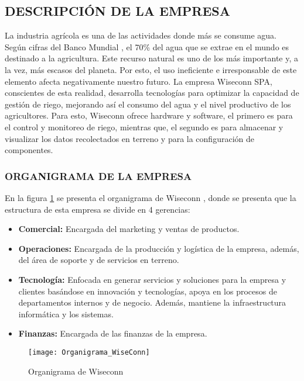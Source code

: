 
\subsection{DESCRIPCIÓN DE LA EMPRESA}

La industria agrícola es una de las actividades donde más se consume agua. Según cifras del Banco Mundial \cite{bancomundialagua}, el 70\% del agua que se extrae en el mundo es destinado a la agricultura. Este recurso natural es uno de los más importante y, a la vez, más escasos del planeta. Por esto, el uso ineficiente e irresponsable de este elemento afecta negativamente nuestro futuro.
La empresa Wiseconn SPA, conscientes de esta realidad, desarrolla tecnologías para optimizar la capacidad de gestión de riego, mejorando así el consumo del agua y el nivel productivo de los agricultores. Para esto, Wiseconn ofrece hardware y software, el primero es para el control y monitoreo de riego, mientras que, el segundo es para almacenar y visualizar los datos recolectados en terreno y para la configuración de componentes.

\subsubsection{ORGANIGRAMA DE LA EMPRESA}

En la figura \ref{fig:orgwis} se presenta el organigrama de Wiseconn , donde se presenta que la estructura de esta empresa se divide en 4 gerencias:
\begin{itemize}
	\item \textbf{Comercial:} Encargada del marketing y ventas de productos.
	\item \textbf{Operaciones:} Encargada de la producción y logística de la empresa, además, del área de soporte y de servicios en terreno.
	\item \textbf{Tecnología:} Enfocada en generar servicios y soluciones para la empresa y clientes basándose en innovación y tecnologías, apoya en los procesos de departamentos internos y de negocio. Además, mantiene la infraestructura informática y los sistemas.
	\item \textbf{Finanzas:} Encargada de las finanzas de la empresa.
\end{itemize}

\begin{figure}[H]
	\centering
	\texttt{[image: Organigrama\_WiseConn]}
	\caption{\label{fig:orgwis} Organigrama de Wiseconn}
\end{figure}

